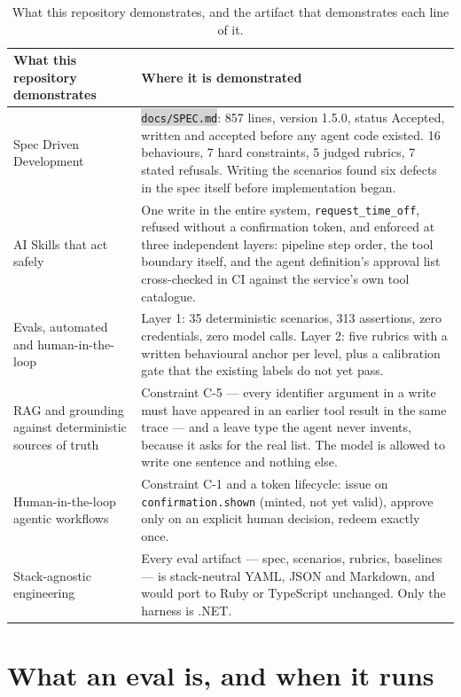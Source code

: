 \documentclass[11pt,a4paper]{article}
\newcommand{\repopath}[1]{\colorbox{lightgray}{\texttt{#1}}}
\begin{document}
\begin{table}[htbp]
\centering
\small
\begin{tabularx}{\linewidth}{@{}>{\raggedright\arraybackslash}p{4.6cm}X@{}}
\toprule
\textbf{What this repository demonstrates} & \textbf{Where it is demonstrated} \\
\midrule
Spec Driven Development &
\repopath{docs/SPEC.md}: 857 lines, version 1.5.0, status Accepted, written
and accepted before any agent code existed. 16 behaviours, 7 hard constraints,
5 judged rubrics, 7 stated refusals. Writing the scenarios found six defects
in the spec itself before implementation began. \\
\addlinespace
AI Skills that act safely &
One write in the entire system, \texttt{request\_time\_off}, refused without a
confirmation token, and enforced at three independent layers: pipeline step
order, the tool boundary itself, and the agent definition's approval list
cross-checked in CI against the service's own tool catalogue. \\
\addlinespace
Evals, automated and human-in-the-loop &
Layer 1: 35 deterministic scenarios, 313 assertions, zero credentials, zero
model calls. Layer 2: five rubrics with a written behavioural anchor per
level, plus a calibration gate that the existing labels do not yet pass. \\
\addlinespace
RAG and grounding against deterministic sources of truth &
Constraint C-5 --- every identifier argument in a write must have appeared in
an earlier tool result in the same trace --- and a leave type the agent never
invents, because it asks for the real list. The model is allowed to write one
sentence and nothing else. \\
\addlinespace
Human-in-the-loop agentic workflows &
Constraint C-1 and a token lifecycle: issue on \texttt{confirmation.shown}
(minted, not yet valid), approve only on an explicit human decision, redeem
exactly once. \\
\addlinespace
Stack-agnostic engineering &
Every eval artifact --- spec, scenarios, rubrics, baselines --- is
stack-neutral YAML, JSON and Markdown, and would port to Ruby or TypeScript
unchanged. Only the harness is .NET. \\
\bottomrule
\end{tabularx}
\caption{What this repository demonstrates, and the artifact that
demonstrates each line of it.}
\label{tab:capmap}
\end{table}

\section{What an eval is, and when it runs}
\end{document}
